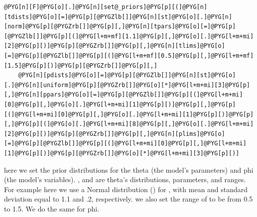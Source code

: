 \documentclass[a4paper,10pt,english]{manual}
\begin{document}
\begin{Verbatim}[commandchars=@\[\]]
@PYG[n][F]@PYG[o][.]@PYG[n][set@_priors]@PYG[p][(]@PYG[n][tdists]@PYG[o][=]@PYG[p][@PYGZlb[]]@PYG[n][st]@PYG[o][.]@PYG[n][norm]@PYG[p][@PYGZrb[]]@PYG[p][,]@PYG[n][tpars]@PYG[o][=]@PYG[p][@PYGZlb[]]@PYG[p][(]@PYG[l+m+mf][1.1]@PYG[p][,]@PYG[o][.]@PYG[l+m+mi][2]@PYG[p][)]@PYG[p][@PYGZrb[]]@PYG[p][,]@PYG[n][tlims]@PYG[o][=]@PYG[p][@PYGZlb[]]@PYG[p][(]@PYG[l+m+mf][0.5]@PYG[p][,]@PYG[l+m+mf][1.5]@PYG[p][)]@PYG[p][@PYGZrb[]]@PYG[p][,]
    @PYG[n][pdists]@PYG[o][=]@PYG[p][@PYGZlb[]]@PYG[n][st]@PYG[o][.]@PYG[n][uniform]@PYG[p][@PYGZrb[]]@PYG[o][*]@PYG[l+m+mi][3]@PYG[p][,]@PYG[n][ppars]@PYG[o][=]@PYG[p][@PYGZlb[]]@PYG[p][(]@PYG[l+m+mi][0]@PYG[p][,]@PYG[o][.]@PYG[l+m+mi][1]@PYG[p][)]@PYG[p][,]@PYG[p][(]@PYG[l+m+mi][0]@PYG[p][,]@PYG[o][.]@PYG[l+m+mi][1]@PYG[p][)]@PYG[p][,]@PYG[p][(]@PYG[o][.]@PYG[l+m+mi][8]@PYG[p][,]@PYG[o][.]@PYG[l+m+mi][2]@PYG[p][)]@PYG[p][@PYGZrb[]]@PYG[p][,]@PYG[n][plims]@PYG[o][=]@PYG[p][@PYGZlb[]]@PYG[p][(]@PYG[l+m+mi][0]@PYG[p][,]@PYG[l+m+mi][1]@PYG[p][)]@PYG[p][@PYGZrb[]]@PYG[o][*]@PYG[l+m+mi][3]@PYG[p][)]
\end{Verbatim}

here we set the prior distributions for the theta (the model's parameters) and phi (the model's variables). ,  and  are theta's distributions, parameters, and ranges. For example here we use a Normal distribution () for , with mean and standard deviation equal to 1.1 and .2, respectively. we also set the range of  to be from 0.5 to 1.5. We do the same for phi.
\end{document}
